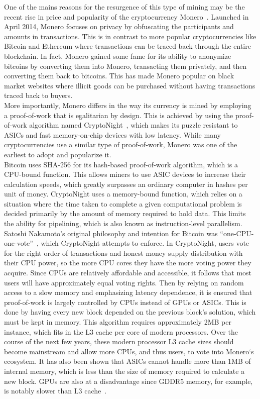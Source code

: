 One of the mains reasons for the resurgence of this type of mining may be the recent rise in price and popularity of the cryptocurrency Monero~\cite{monero}. Launched in April 2014, Monero focuses on privacy by obfuscating the participants and amounts in transactions. This is in contrast to more popular cryptocurrencies like Bitcoin and Ethereum where transactions can be traced back through the entire blockchain. In fact, Monero gained some fame for its ability to anonymize bitcoins by converting them into Monero, transacting them privately, and then converting them back to bitcoins. This has made Monero popular on black market websites where illicit goods can be purchased without having transactions traced back to buyers. 
\\
More importantly, Monero differs in the way its currency is mined by employing a proof-of-work that is egalitarian by design. This is achieved by using the proof-of-work algorithm named CryptoNight~\cite{cryptoknight}, which makes its puzzle resistant to ASICs and fast memory-on-chip devices with low latency. While many cryptocurrencies use a similar type of proof-of-work, Monero was one of the earliest to adopt and popularize it. 
\\
Bitcoin uses SHA-256 for its hash-based proof-of-work algorithm, which is a CPU-bound function. This allows miners to use ASIC devices to increase their calculation speeds, which greatly surpasses an ordinary computer in hashes per unit of money. CryptoNight uses a memory-bound function, which relies on a situation where the time taken to complete a given computational problem is decided primarily by the amount of memory required to hold data. This limits the ability for pipelining, which is also known as instruction-level parallelism.  
\\
Satoshi Nakamoto’s original philosophy and intention for Bitcoin was “one-CPU-one-vote”~\cite{nakamoto2008bitcoin}, which CryptoNight attempts to enforce. In CryptoNight, users vote for the right order of transactions and honest money supply distribution with their CPU power, so the more CPU cores they have the more voting power they acquire. Since CPUs are relatively affordable and accessible, it follows that most users will have approximately equal voting rights. Then by relying on random access to a slow memory and emphasizing latency dependence, it is ensured that proof-of-work is largely controlled by CPUs instead of GPUs or ASICs. This is done by having every new block depended on the previous block’s solution, which must be kept in memory. This algorithm requires approximately 2MB per instance, which fits in the L3 cache per core of modern processors. Over the course of the next few years, these modern processor L3 cache sizes should become mainstream and allow more CPUs, and thus users, to vote into Monero`s ecosystem. It has also been shown that ASICs cannot handle more than 1MB of internal memory, which is less than the size of memory required to calculate a new block. GPUs are also at a disadvantage since GDDR5 memory, for example, is notably slower than L3 cache~\cite{van2013cryptonote}.  

